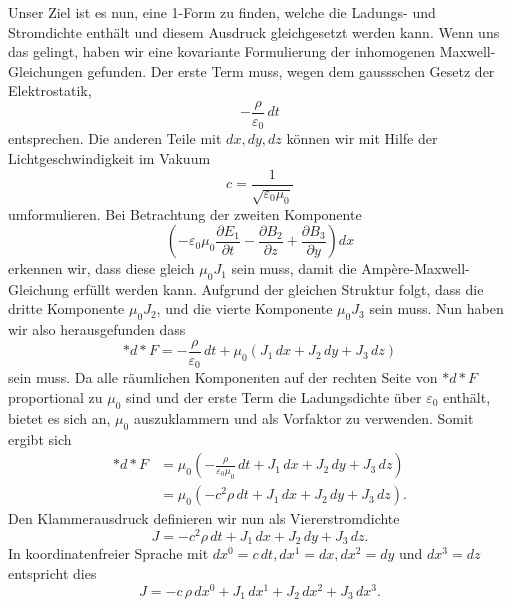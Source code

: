 Unser Ziel ist es nun, eine 1-Form zu finden, welche die Ladungs- und Stromdichte enthält und diesem Ausdruck gleichgesetzt werden kann.
Wenn uns das gelingt, haben wir eine kovariante Formulierung der inhomogenen Maxwell-Gleichungen gefunden.
Der erste Term muss, wegen dem gaussschen Gesetz der Elektrostatik, 
\begin{equation*}
	-\frac{\rho}{\varepsilon_0} \,dt
\end{equation*}
entsprechen.
Die anderen Teile mit $dx,dy,dz$ können wir mit Hilfe der Lichtgeschwindigkeit im Vakuum 
\begin{equation*}
	c = \frac{1}{\sqrt{\varepsilon_0 \mu_0}}
\end{equation*}
umformulieren.
Bei Betrachtung der zweiten Komponente
\begin{equation*}
	\left(-\varepsilon_0 \mu_0 \frac{\partial E_1}{\partial t} - \frac{\partial B_2}{\partial z} + \frac{\partial B_3}{\partial y}\right)dx
\end{equation*}
erkennen wir, dass diese gleich $\mu_0 J_1$ sein muss, damit die Ampère-Maxwell-Gleichung erfüllt werden kann.
Aufgrund der gleichen Struktur folgt, dass die dritte Komponente $\mu_0 J_2$, und die vierte Komponente $\mu_0 J_3$ sein muss.
Nun haben wir also herausgefunden dass
\begin{equation}
	\ast d {\ast} F = -\frac{\rho}{\varepsilon_0}\,dt + \mu_0 (J_1 \,dx +  J_2 \,dy +  J_3 \,dz)
\end{equation}
sein muss.
Da alle räumlichen Komponenten auf der rechten Seite von $\ast d {\ast} F$ proportional zu $\mu_0$ sind und der erste Term die Ladungsdichte über $\varepsilon_0$ enthält, bietet es sich an, $\mu_0$ auszuklammern und als Vorfaktor zu verwenden.
Somit ergibt sich
\begin{align*}
	\ast d {\ast} F
	& = \mu_0 \left( -\frac{\rho}{\varepsilon_0 \mu_0}\,dt + J_1\, dx + J_2\, dy + J_3\, dz \right)\\[2ex]
	& = \mu_0 \left( -c^2 \rho \,dt + J_1 \,dx + J_2 \,dy + J_3 \,dz \right).
\end{align*}
Den Klammerausdruck definieren wir nun als Viererstromdichte
\begin{equation}
	J = -c^2 \rho\, dt + J_1 \,dx + J_2 \,dy + J_3 \,dz.
\end{equation}
In koordinatenfreier Sprache mit $dx^0 = c\,dt, dx^1 = dx,dx^2=dy$ und $dx^3 = dz$ entspricht dies
\begin{equation}
	J = -c\,\rho\,dx^0 + J_1 \,dx^1 + J_2 \,dx^2 + J_3 \,dx^3.
\end{equation}

